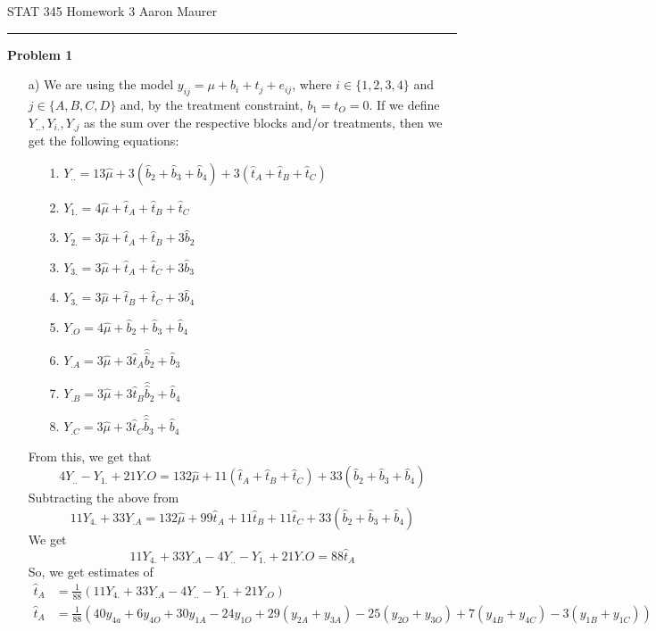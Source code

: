 \documentclass[11pt]{article}
\theoremstyle{definition}
\begin{document}

STAT 345 Homework 3 \hfill Aaron Maurer
\vspace{2mm}
\hrule
\vspace{2mm}
{\bf Problem 1}
\begin{itemize}
    \item[a)]
        We are using the model \(y_{ij}=\mu+b_i+t_j+e_{ij}\), where $i\in\{1,2,3,4\}$ and $j\in\{A,B,C,D\}$ and, by the treatment constraint, $b_1=t_O=0$. If we define \(Y_{..},Y_{i.},Y_{.j}\) as the sum over the respective blocks and/or treatments, then we get the following equations:
        \begin{itemize}
            \item[1.] \( Y_{..}=13\hat\mu+3(\hat b_2 + \hat b_3 + \hat b_4) + 3(\hat t_A + \hat t_B + \hat t_C)\)
            \item[2.] \( Y_{1.}=4\hat\mu+\hat t_A + \hat t_B + \hat t_C\)
            \item[3.] \( Y_{2.}=3\hat\mu+\hat t_A + \hat t_B + 3\hat b_2 \)
            \item[3.] \( Y_{3.}=3\hat\mu+\hat t_A + \hat t_C + 3\hat b_3 \)
            \item[4.] \( Y_{3.}=3\hat\mu+\hat t_B + \hat t_C + 3\hat b_4 \)
            \item[5.] \( Y_{.O}=4\hat\mu+\hat b_2 + \hat b_3 + \hat b_4 \)
            \item[6.] \( Y_{.A}=3\hat\mu+3\hat t_A \hat\hat b_2 + \hat b_3  \)
            \item[7.] \( Y_{.B}=3\hat\mu+3\hat t_B \hat\hat b_2 + \hat b_4  \)
            \item[8.] \( Y_{.C}=3\hat\mu+3\hat t_C \hat\hat b_3 + \hat b_4  \)
        \end{itemize}
        From this, we get that
            \[4Y_{..} - Y_{1.} + 21Y{.O}=132\hat\mu + 11(\hat t_A + \hat t_B +\hat t_C) + 33(\hat b_2 + \hat b_3 + \hat b_4) \]
        Subtracting the above from 
            \[11Y_{4.} + 33Y_{.A} = 132\hat\mu + 99 \hat t_A + 11\hat t_B + 11\hat t_C + 33(\hat b_2 + \hat b_3 + \hat b_4) \]
        We get 
            \[11Y_{4.} + 33Y_{.A} - 4Y_{..} - Y_{1.} + 21Y{.O} =  88\hat t_A\]
        So, we get estimates of 
        \begin{align*}
            \hat t_A &= \frac{1}{88}(11Y_{4.} + 33Y_{.A} - 4Y_{..} - Y_{1.} + 21Y_{.O}) \\
            \hat t_A &= \frac{1}{88}(40y_{4a}+6y_{4O}+30y_{1A}-24y_{1O}+29(y_{2A}+y_{3A})-25(y_{2O}+y_{3O})+7(y_{4B}+y_{4C})-3(y_{1B}+y_{1C})) \\

\end{align*}
\end{itemize}
\end{document}
